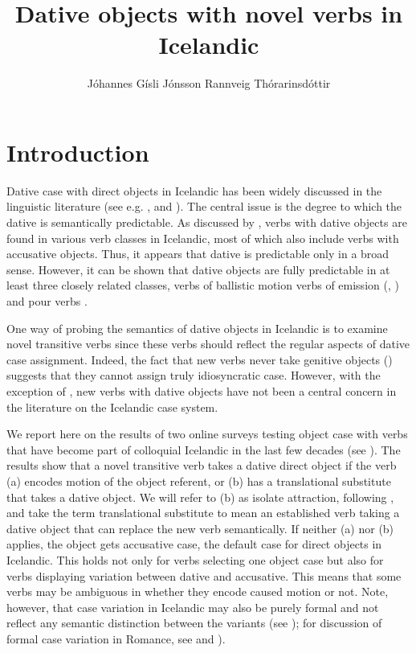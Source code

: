 \documentclass[output=paper,modfonts,nonflat,colorlinks,citecolor=brown]{langsci/langscibook}
\author{Jóhannes Gísli Jónsson\affiliation{Unversity of Iceland}\lastand
Rannveig Thórarinsdóttir\affiliation{Unversity of Iceland}}
\title{Dative objects with novel verbs in Icelandic}
\begin{document}
\maketitle




\section{Introduction} %
\label{sec:jonsson:1}

Dative case with direct objects in Icelandic has been widely discussed in the linguistic literature (see e.g. \citealt{YipEtAl1987,Barðdal2001,Barðdal2008,Svenonius2002,Maling2002}, and \citealt{Jónsson2013a}). The central issue is the degree to which the dative is semantically predictable. As discussed by \citet{Maling2002}, verbs with dative objects are found in various verb classes in Icelandic, most of which also include verbs with accusative objects. Thus, it appears that dative is predictable only in a broad sense. However, it can be shown that dative objects are fully predictable in at least three closely related classes, verbs of ballistic motion \citep{Svenonius2002} verbs of emission (\citealt{Maling2002}, \citealt{Jónsson2013a}) and pour verbs \citep{Jónsson2013a}.

One way of probing the semantics of dative objects in Icelandic is to examine novel transitive verbs since these verbs should reflect the regular aspects of dative case assignment. Indeed, the fact that new verbs never take genitive objects (\citealt{JónssonEythórsson2011}) suggests that they cannot assign truly idiosyncratic case. However, with the exception of \citet{Barðdal2001,Barðdal2008}, new verbs with dative objects have not been a central concern in the literature on the Icelandic case system.

We report here on the results of two online surveys testing object case with verbs that have become part of colloquial Icelandic in the last few decades (see \citealt{Thórarinsdóttir2015}). The results show that a novel transitive verb takes a dative direct object if the verb (a) encodes motion of the object referent, or (b) has a translational substitute that takes a dative object. We will refer to (b) as isolate attraction, following \citet{Barðdal2001}, and take the term translational substitute to mean an established verb taking a dative object that can replace the new verb semantically. If neither (a) nor (b) applies, the object gets accusative case, the default case for direct objects in Icelandic. This holds not only for verbs selecting one object case but also for verbs displaying variation between dative and accusative. This means that some verbs may be ambiguous in whether they encode caused motion or not. Note, however, that case variation in Icelandic may also be purely formal and not reflect any semantic distinction between the variants (see \citealt{Jónsson2013b}); for discussion of formal case variation in Romance, see  and ).
\end{document}
